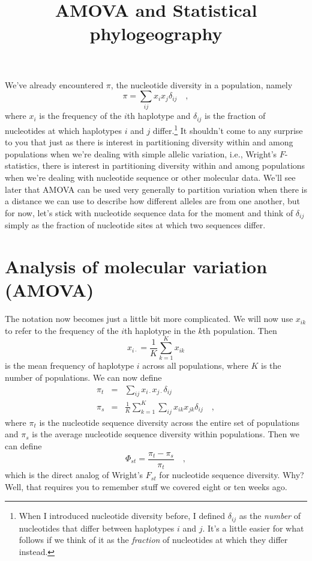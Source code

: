 \documentclass[12pt]{article}
\title{AMOVA and Statistical phylogeography}
\begin{document}
\maketitle

\thispagestyle{first}

We've already encountered $\pi$, the nucleotide diversity in a
population, namely
\[
\pi = \sum_{ij} x_ix_j \delta_{ij} \quad ,
\]
where $x_i$ is the frequency of the $i$th haplotype and $\delta_{ij}$
is the fraction of nucleotides at which haplotypes $i$ and $j$
differ.\footnote{When I introduced nucleotide diversity before, I
  defined $\delta_{ij}$ as the {\it number\/} of nucleotides that
  differ between haplotypes $i$ and $j$. It's a little easier for what
  follows if we think of it as the {\it fraction\/} of nucleotides at
  which they differ instead.} It shouldn't come to any surprise to you
that just as there is interest in partitioning diversity within and
among populations when we're dealing with simple allelic variation,
i.e., Wright's $F$-statistics, there is interest in partitioning
diversity within and among populations when we're dealing with
nucleotide sequence or other molecular data. We'll see later that
AMOVA can be used very generally to partition variation when there is
a distance we can use to describe how different alleles are from one
another, but for now, let's stick with nucleotide sequence data for
the moment and think of $\delta_{ij}$ simply as the fraction of
nucleotide sites at which two sequences differ.

\section*{Analysis of molecular variation (AMOVA)}

The notation now becomes just a little bit more complicated. We will
now use $x_{ik}$ to refer to the frequency of the $i$th haplotype in
the $k$th population. Then
\[
x_{i\cdot} = \frac{1}{K}\sum_{k=1}^K x_{ik}
\]
is the mean frequency of haplotype $i$ across all populations, where
$K$ is the number of populations. We can now define
\begin{eqnarray*}
\pi_t &=& \sum_{ij} x_{i\cdot}x_{j\cdot} \delta_{ij} \\
\pi_s &=& \frac{1}{K}\sum_{k=1}^K\sum_{ij} x_{ik}x_{jk}\delta_{ij} \quad ,
\end{eqnarray*}
where $\pi_t$ is the nucleotide sequence diversity across the entire
set of populations and $\pi_s$ is the average nucleotide sequence
diversity within populations. Then we can define
\begin{equation}
\Phi_{st} = \frac{\pi_t - \pi_s}{\pi_t} \quad ,
\label{eq:phi-st}
\end{equation}
which is the direct analog of Wright's $F_{st}$ for nucleotide
sequence diversity. Why? Well, that requires you to remember stuff we
covered eight or ten weeks ago.
\end{document}
